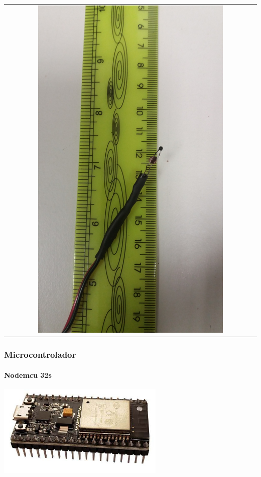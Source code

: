 \documentclass[12pt,handout]{beamer}
\begin{document}
\begin{frame}
\begin{tabular}{c}
    \includegraphics[width=0.75\textwidth]{20181106_192224.jpg}
  \end{tabular}
\end{frame}

\begin{frame}
  \frametitle{Microcontrolador}
  \framesubtitle{Nodemcu 32s}
  \centering
  \includegraphics[width=0.6\textwidth]{nodemcu32s.jpg}\\
\end{frame}
\end{document}

